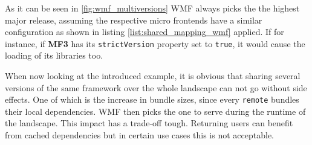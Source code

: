 As it can be seen in \ref{fig:wmf_multiversions} WMF always picks the the highest major release, assuming the respective micro frontends have a similar configuration as shown in listing \ref{list:shared_mapping_wmf} applied. If for instance, if \textbf{MF3} has its \texttt{strictVersion} property set to \texttt{true}, it would cause the loading of its libraries too.

When now looking at the introduced example, it is obvious that sharing several versions of the same framework over the whole landscape can not go without side effects. One of which is the increase in bundle sizes, since every \texttt{remote} bundles their local dependencies. WMF then picks the one to serve during the runtime of the landscape.
This impact has a trade-off tough. Returning users can benefit from cached dependencies but in certain use cases this is not acceptable.\cite{wmf_multi_versions}
 
